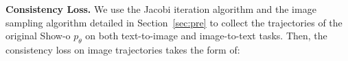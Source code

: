 \noindent \textbf{Consistency Loss.}
We use the Jacobi iteration algorithm and the image sampling algorithm detailed in Section~\ref{sec:pre} to collect the trajectories of the original Show-o $p_\theta$ on both text-to-image and image-to-text tasks. 
Then, the consistency loss on image trajectories takes the form of:
